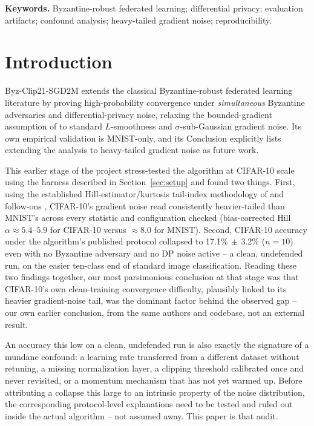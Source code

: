 \documentclass{article}
\begin{document}
\textbf{Keywords.} Byzantine-robust federated learning; differential privacy; evaluation
artifacts; confound analysis; heavy-tailed gradient noise; reproducibility.

\section{Introduction}
\label{sec:intro}

Byz-Clip21-SGD2M \citep{islamov2026byzclip} extends the classical Byzantine-robust
federated learning literature \citep{allouah2023trilemma,karimireddy2020byzantine}
by proving high-probability convergence under \emph{simultaneous} Byzantine
adversaries and differential-privacy noise, relaxing the bounded-gradient
assumption of \citet{allouah2023trilemma} to standard $L$-smoothness and
$\sigma$-sub-Gaussian gradient noise. Its own empirical validation is MNIST-only,
and its Conclusion explicitly lists extending the analysis to heavy-tailed
gradient noise as future work.

This earlier stage of the project stress-tested the algorithm at CIFAR-10 scale
using the harness described in Section~\ref{sec:setup} and found two things.
First, using the established Hill-estimator/kurtosis tail-index methodology of
\citet{simsekli2019tailindex} and follow-ons
\citep{zhang2020adaptive,gurbuzbalaban2021heavytail,barsbey2021compressibility},
CIFAR-10's gradient noise read consistently heavier-tailed than MNIST's across
every statistic and configuration checked (bias-corrected Hill $\alpha \approx
5.4$--$5.9$ for CIFAR-10 versus $\approx 8.0$ for MNIST). Second, CIFAR-10
accuracy under the algorithm's published protocol collapsed to
17.1\%$\,\pm\,$3.2\% ($n{=}10$) even with no Byzantine adversary and no DP noise
active -- a clean, undefended run, on the easier ten-class end of standard image
classification. Reading these two findings together, our most parsimonious
conclusion at that stage was that CIFAR-10's own clean-training convergence
difficulty, plausibly linked to its heavier gradient-noise tail, was the
dominant factor behind the observed gap -- our own earlier conclusion, from the
same authors and codebase, not an external result.

An accuracy this low on a clean, undefended run is also exactly the signature of
a mundane confound: a learning rate transferred from a different dataset without
retuning, a missing normalization layer, a clipping threshold calibrated once and
never revisited, or a momentum mechanism that has not yet warmed up. Before
attributing a collapse this large to an intrinsic property of the noise
distribution, the corresponding protocol-level explanations need to be tested and
ruled out inside the actual algorithm -- not assumed away. This paper is that
audit.
\end{document}
